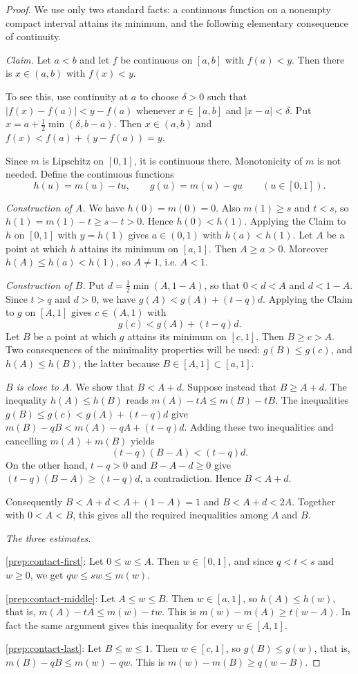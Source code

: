 \begin{proof}
We use only two standard facts: a continuous function on a nonempty compact interval attains its minimum, and the following elementary consequence of continuity.

\emph{Claim.} Let $a<b$ and let $f$ be continuous on $[a,b]$ with $f(a)<y$. Then there is $x\in(a,b)$ with $f(x)<y$.

To see this, use continuity at $a$ to choose $\delta>0$ such that $|f(x)-f(a)|<y-f(a)$ whenever $x\in[a,b]$ and $|x-a|<\delta$. Put $x=a+\tfrac12\min(\delta,b-a)$. Then $x\in(a,b)$ and $f(x)<f(a)+(y-f(a))=y$.

Since $m$ is Lipschitz on $[0,1]$, it is continuous there. Monotonicity of $m$ is not needed. Define the continuous functions
\[
 h(u)=m(u)-tu,\qquad g(u)=m(u)-qu\qquad(u\in[0,1]).
\]

\emph{Construction of $A$.} We have $h(0)=m(0)=0$. Also $m(1)\ge s$ and $t<s$, so $h(1)=m(1)-t\ge s-t>0$. Hence $h(0)<h(1)$. Applying the Claim to $h$ on $[0,1]$ with $y=h(1)$ gives $a\in(0,1)$ with $h(a)<h(1)$. Let $A$ be a point at which $h$ attains its minimum on $[a,1]$. Then $A\ge a>0$. Moreover $h(A)\le h(a)<h(1)$, so $A\neq 1$, i.e. $A<1$.

\emph{Construction of $B$.} Put $d=\tfrac12\min(A,1-A)$, so that $0<d<A$ and $d<1-A$. Since $t>q$ and $d>0$, we have $g(A)<g(A)+(t-q)d$. Applying the Claim to $g$ on $[A,1]$ gives $c\in(A,1)$ with
\[
 g(c)<g(A)+(t-q)d .
\]
Let $B$ be a point at which $g$ attains its minimum on $[c,1]$. Then $B\ge c>A$. Two consequences of the minimality properties will be used: $g(B)\le g(c)$, and $h(A)\le h(B)$, the latter because $B\in[A,1]\subset[a,1]$.

\emph{$B$ is close to $A$.} We show that $B<A+d$. Suppose instead that $B\ge A+d$. The inequality $h(A)\le h(B)$ reads $m(A)-tA\le m(B)-tB$. The inequalities $g(B)\le g(c)<g(A)+(t-q)d$ give $m(B)-qB<m(A)-qA+(t-q)d$. Adding these two inequalities and cancelling $m(A)+m(B)$ yields
\[
 (t-q)(B-A)<(t-q)d .
\]
On the other hand, $t-q>0$ and $B-A-d\ge 0$ give $(t-q)(B-A)\ge(t-q)d$, a contradiction. Hence $B<A+d$.

Consequently $B<A+d<A+(1-A)=1$ and $B<A+d<2A$. Together with $0<A<B$, this gives all the required inequalities among $A$ and $B$.

\emph{The three estimates.}

\eqref{prep:contact-first}: Let $0\le w\le A$. Then $w\in[0,1]$, and since $q<t<s$ and $w\ge 0$, we get $qw\le sw\le m(w)$.

\eqref{prep:contact-middle}: Let $A\le w\le B$. Then $w\in[a,1]$, so $h(A)\le h(w)$, that is, $m(A)-tA\le m(w)-tw$. This is $m(w)-m(A)\ge t(w-A)$. In fact the same argument gives this inequality for every $w\in[A,1]$.

\eqref{prep:contact-last}: Let $B\le w\le 1$. Then $w\in[c,1]$, so $g(B)\le g(w)$, that is, $m(B)-qB\le m(w)-qw$. This is $m(w)-m(B)\ge q(w-B)$.
\end{proof}
